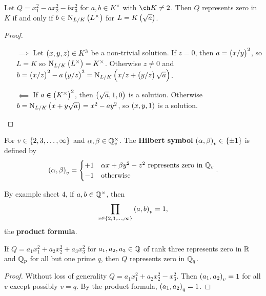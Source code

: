 \pagebreak

\begin{lemma}
\label{lem:24.2}
Let $ Q = x_1^2 - ax_2^2 - bx_3^2 $ for $ a, b \in K^\times $ with $ \ch K \ne 2 $. Then $ Q $ represents zero in $ K $ if and only if $ b \in \N_{L / K}\br{L^\times} $ for $ L = K\br{\sqrt{a}} $.
\end{lemma}

\begin{proof}
\hfill
\begin{itemize}
\item[$ \implies $] Let $ \br{x, y, z} \in K^3 $ be a non-trivial solution. If $ z = 0 $, then $ a = \br{x / y}^2 $, so $ L = K $ so $ \N_{L / K}\br{L^\times} = K^\times $. Otherwise $ z \ne 0 $ and $ b = \br{x / z}^2 - a\br{y / z}^2 = \N_{L / K}\br{x / z + \br{y / z}\sqrt{a}} $.
\item[$ \impliedby $] If $ a \in \br{K^\times}^2 $, then $ \br{\sqrt{a}, 1, 0} $ is a solution. Otherwise $ b = \N_{L / K}\br{x + y\sqrt{a}} = x^2 - ay^2 $, so $ \br{x, y, 1} $ is a solution.
\end{itemize}
\end{proof}

\begin{definition}
For $ v \in \cbr{2, 3, \dots, \infty} $ and $ \alpha, \beta \in \mathbb{Q}_v^\times $. The \textbf{Hilbert symbol} $ \br{\alpha, \beta}_v \in \cbr{\pm 1} $ is defined by
$$ \br{\alpha, \beta}_v =
\begin{cases}
+1 & \alpha x + \beta y^2 - z^2 \ \text{represents zero in} \ \QQ_v \\
-1 & \text{otherwise}
\end{cases}.
$$
\end{definition}

By example sheet $ 4 $, if $ a, b \in \mathbb{Q}^\times $, then
$$ \prod_{v \in \cbr{2, 3, \dots, \infty}} \br{a, b}_v = 1, $$
the \textbf{product formula}.

\begin{corollary}
\label{cor:24.4}
If $ Q = a_1x_1^2 + a_2x_2^2 + a_3x_3^2 $ for $ a_1, a_2, a_3 \in \mathbb{Q} $ of rank three represents zero in $ \mathbb{R} $ and $ \mathbb{Q}_p $ for all but one prime $ q $, then $ Q $ represents zero in $ \mathbb{Q}_q $.
\end{corollary}

\begin{proof}
Without loss of generality $ Q = a_1x_1^2 + a_2x_2^2 - x_3^2 $. Then $ \br{a_1, a_2}_v = 1 $ for all $ v $ except possibly $ v = q $. By the product formula, $ \br{a_1, a_2}_q = 1 $.
\end{proof}

